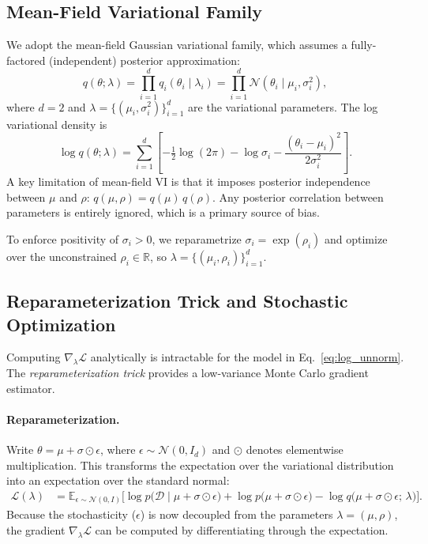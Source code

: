 \documentclass[12pt,a4paper]{article}
\newcommand{\D}{\mathcal{D}}
\newcommand{\N}{\mathcal{N}}
\newcommand{\E}{\mathbb{E}}
\newcommand{\R}{\mathbb{R}}
\newcommand{\ELBO}{\mathcal{L}}
\newcommand{\lam}{\lambda}
\newcommand{\sig}{\sigma}
\begin{document}
\subsection{Mean-Field Variational Family}

We adopt the mean-field Gaussian variational family, which assumes
a fully-factored (independent) posterior approximation:
\begin{equation}
  q(\theta; \lam)
  = \prod_{i=1}^{d} q_i(\theta_i \mid \lam_i)
  = \prod_{i=1}^{d} \N(\theta_i \mid \mu_i, \sig_i^2),
  \label{eq:mean_field}
\end{equation}
where $d = 2$ and $\lam = \{(\mu_i, \sig_i^2)\}_{i=1}^{d}$ are the
variational parameters.
The log variational density is
\begin{equation}
  \log q(\theta;\lam)
  = \sum_{i=1}^{d}\!
    \left[-\tfrac{1}{2}\log(2\pi) - \log\sig_i
    - \frac{(\theta_i - \mu_i)^2}{2\sig_i^2}\right].
  \label{eq:log_q}
\end{equation}
A key limitation of mean-field VI is that it imposes posterior independence
between $\mu$ and $\rho$: $q(\mu, \rho) = q(\mu)\,q(\rho)$.
Any posterior correlation between parameters is entirely ignored,
which is a primary source of bias.

To enforce positivity of $\sig_i > 0$, we reparametrize
$\sig_i = \exp(\rho_i)$ and optimize over the unconstrained
$\rho_i \in \R$, so $\lam = \{(\mu_i, \rho_i)\}_{i=1}^{d}$.

\subsection{Reparameterization Trick and Stochastic Optimization}

Computing $\nabla_\lam \ELBO$ analytically is intractable for the model
in Eq.~\eqref{eq:log_unnorm}.
The \emph{reparameterization trick} \citep{kingma2013auto,rezende2014stochastic}
provides a low-variance Monte Carlo gradient estimator.

\paragraph{Reparameterization.}
Write $\theta = \mu + \sigma \odot \epsilon$, where
$\epsilon \sim \N(0, I_d)$ and $\odot$ denotes elementwise multiplication.
This transforms the expectation over the variational distribution into
an expectation over the standard normal:
\begin{align}
  \ELBO(\lam)
  &= \E_{\epsilon \sim \N(0,I)}\!\bigl[
    \log p\!\bigl(\D \mid \mu + \sig \odot \epsilon\bigr)
    + \log p\!\bigl(\mu + \sig \odot \epsilon\bigr)
    - \log q\!\bigl(\mu + \sig \odot \epsilon;\, \lam\bigr)
  \bigr].
  \label{eq:elbo_reparam}
\end{align}
Because the stochasticity ($\epsilon$) is now decoupled from the
parameters $\lam = (\mu, \rho)$, the gradient $\nabla_\lam \ELBO$
can be computed by differentiating through the expectation.
\end{document}
